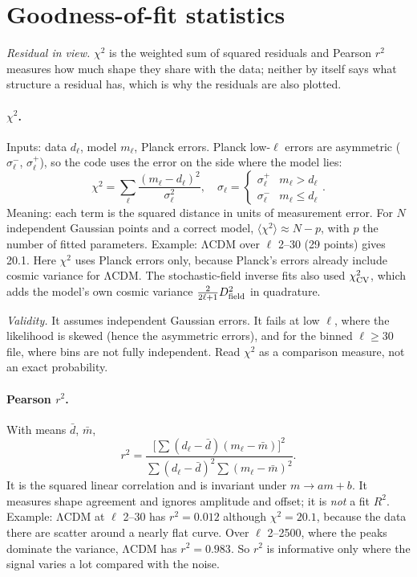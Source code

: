 \documentclass[10pt,twocolumn]{article}
\newcommand{\why}[1]{\par\noindent\textit{Validity.} #1\par}
\begin{document}
\section{Goodness-of-fit statistics}\label{sec:stats}
\noindent\emph{Residual in view.} $\chi^2$ is the weighted sum of squared residuals and Pearson $r^2$ measures how much shape they share with the data; neither by itself says what structure a residual has, which is why the residuals are also plotted.

\paragraph{$\chi^2$.} Inputs: data $d_\ell$, model $m_\ell$, Planck errors. Planck low-$\ell$ errors are asymmetric ($\sigma^-_\ell$, $\sigma^+_\ell$), so the code uses the error on the side where the model lies:
\begin{equation}
\chi^2=\sum_\ell\frac{(m_\ell-d_\ell)^2}{\sigma_\ell^2},\quad\sigma_\ell=\begin{cases}\sigma^+_\ell&m_\ell>d_\ell\\\sigma^-_\ell&m_\ell\le d_\ell\end{cases}.
\end{equation}
Meaning: each term is the squared distance in units of measurement error. For $N$ independent Gaussian points and a correct model, $\langle\chi^2\rangle\approx N-p$, with $p$ the number of fitted parameters. Example: ΛCDM over $\ell$ 2--30 (29 points) gives 20.1. Here $\chi^2$ uses Planck errors only, because Planck's errors already include cosmic variance for ΛCDM. The stochastic-field inverse fits also used $\chi^2_{\rm CV}$, which adds the model's own cosmic variance $\tfrac{2}{2\ell+1}D_{\rm field}^2$ in quadrature.
\why{It assumes independent Gaussian errors. It fails at low $\ell$, where the likelihood is skewed (hence the asymmetric errors), and for the binned $\ell\ge30$ file, where bins are not fully independent. Read $\chi^2$ as a comparison measure, not an exact probability.}

\paragraph{Pearson $r^2$.} With means $\bar d$, $\bar m$,
\begin{equation}
r^2=\frac{\big[\sum(d_\ell-\bar d)(m_\ell-\bar m)\big]^2}{\sum(d_\ell-\bar d)^2\sum(m_\ell-\bar m)^2}.
\end{equation}
It is the squared linear correlation and is invariant under $m\to am+b$. It measures shape agreement and ignores amplitude and offset; it is \emph{not} a fit $R^2$. Example: ΛCDM at $\ell$ 2--30 has $r^2=0.012$ although $\chi^2=20.1$, because the data there are scatter around a nearly flat curve. Over $\ell$ 2--2500, where the peaks dominate the variance, ΛCDM has $r^2=0.983$. So $r^2$ is informative only where the signal varies a lot compared with the noise.
\end{document}
